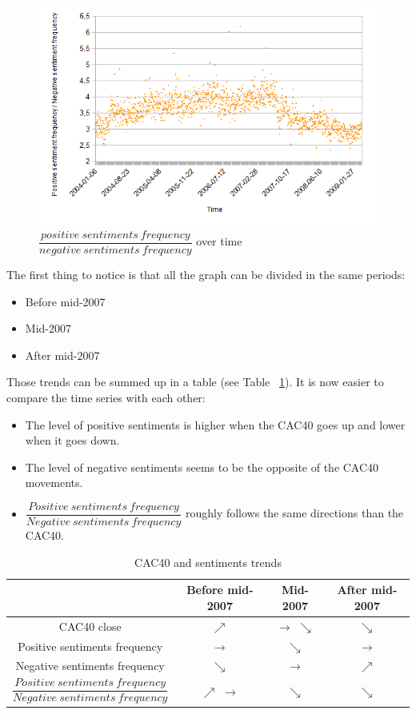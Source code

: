 \documentclass[12pt]{report}
\begin{document}
\begin{figure}[h!]
	\caption{$\dfrac{positive\ sentiments\ frequency}{negative\ sentiments\ frequency}$ over time\label{posdivneg}}
	\includegraphics{plots/time/posdivneg.png}
\end{figure}

The first thing to notice is that all the graph can be divided in the same periods:
\begin{itemize}
	\item Before mid-2007
	\item Mid-2007
	\item After mid-2007
\end{itemize}

Those trends can be summed up in a table (see Table ~\ref{trends}). It is now easier to compare the time series with each other:
\begin{itemize}
	\item The level of positive sentiments is higher when the CAC40 goes up and lower when it goes down.
	\item The level of negative sentiments seems to be the opposite of the CAC40 movements.
	\item $\dfrac{Positive\ sentiments\ frequency}{Negative\ sentiments\ frequency}$ roughly follows the same directions than the CAC40.
\end{itemize}

\begin{center}
	\begin{table}
		\begin{tabular}{|c | c | c | c|}
			\hline
			& Before mid-2007 & Mid-2007 & After mid-2007\\
			\hline
			CAC40 close & $\nearrow$ & $\rightarrow$ $\searrow$ & $\searrow$\\
			\hline
			Positive sentiments frequency & $\rightarrow$ & $\searrow$ & $\rightarrow$\\
			\hline
			Negative sentiments frequency & $\searrow$ & $\rightarrow$ & $\nearrow$\\
			\hline
			$\dfrac{Positive\ sentiments\ frequency}{Negative\ sentiments\ frequency}$ & $\nearrow$ $\rightarrow$ & $\searrow$ & $\searrow$\\
			\hline
		\end{tabular}
		\caption{CAC40 and sentiments trends\label{trends}}
	\end{table}
\end{center}
\end{document}
